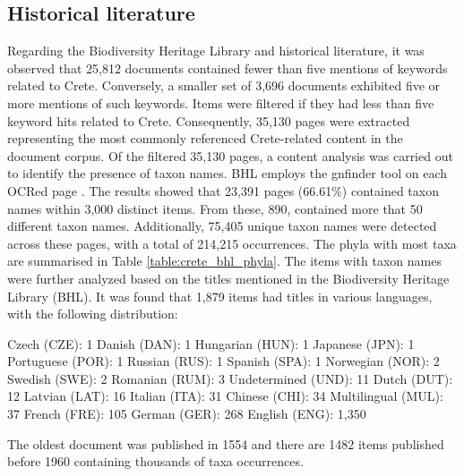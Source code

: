 \subsection{Historical literature}
Regarding the Biodiversity Heritage Library and historical literature, it was
observed that 25,812 documents contained fewer than five mentions of keywords related to Crete.
Conversely, a smaller set of 3,696 documents exhibited five or more mentions of such keywords.
Items were filtered if they had less than five keyword hits related to Crete.
Consequently, 35,130 pages were extracted representing the most commonly referenced Crete-related content in the document corpus.
Of the filtered 35,130 pages, a content analysis was carried out to identify the presence of taxon names.
BHL employs the gnfinder tool on each OCRed page \parencite{mozzherin_gnamesgnfinder_2022}.
The results showed that 23,391 pages (66.61\%) contained taxon names within 3,000 distinct items.
From these, 890, contained more that 50 different taxon names.
Additionally, 75,405 unique taxon names were detected across these pages, with a total of 214,215 occurrences. 
The phyla with most taxa are summarised in Table \ref{table:crete_bhl_phyla}. 
The items with taxon names were further analyzed based on the titles mentioned
in the Biodiversity Heritage Library (BHL). It was found that 1,879 items had titles in various languages, with the following distribution:

Czech (CZE): 1
Danish (DAN): 1
Hungarian (HUN): 1
Japanese (JPN): 1
Portuguese (POR): 1
Russian (RUS): 1
Spanish (SPA): 1
Norwegian (NOR): 2
Swedish (SWE): 2
Romanian (RUM): 3
Undetermined (UND): 11
Dutch (DUT): 12
Latvian (LAT): 16
Italian (ITA): 31
Chinese (CHI): 34
Multilingual (MUL): 37
French (FRE): 105
German (GER): 268
English (ENG): 1,350

The oldest document was published in 1554 and there are 1482 items published before 1960 containing thousands of taxa occurrences.


